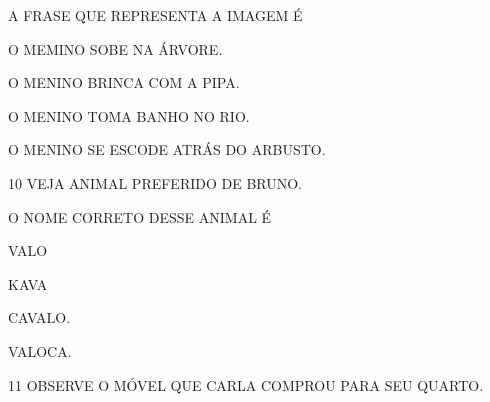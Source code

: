 \begin{escola}
{%

A FRASE QUE REPRESENTA A IMAGEM É

\begin{escolha}
\item O MEMINO SOBE NA ÁRVORE.

\item O MENINO BRINCA COM A PIPA.

\item O MENINO TOMA BANHO NO RIO.

\item O MENINO SE ESCODE ATRÁS DO ARBUSTO.
\end{escolha}

\num{10} VEJA ANIMAL PREFERIDO DE BRUNO.



O NOME CORRETO DESSE ANIMAL É

\begin{escolha}
\item VALO

\item KAVA

\item CAVALO.

\item VALOCA.
\end{escolha}


\num{11} OBSERVE O MÓVEL QUE CARLA COMPROU PARA SEU QUARTO.



}
\end{escola}
